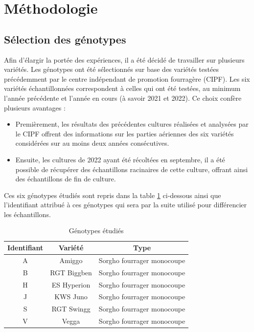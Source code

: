 \section{Méthodologie}

\subsection{Sélection des génotypes}
Afin d'élargir la portée des expériences, il a été décidé de travailler sur plusieurs variétés.
Les génotypes ont été sélectionnés sur base des variétés testées précédemment par le centre indépendant de promotion fourragère (CIPF).
Les six variétés échantillonnées correspondent à celles qui ont été testées, au minimum l'année précédente et l'année en cours (à savoir 2021 et 2022).
Ce choix confère plusieurs avantages :
\begin{itemize}
    \item Premièrement, les résultats des précédentes cultures réalisées et analysées par le CIPF offrent des informations sur les parties aériennes des six variétés considérées sur au moins deux années consécutives.
    \item Ensuite, les cultures de 2022 ayant été récoltées en septembre, il a été possible de récupérer des échantillons racinaires de cette culture, offrant ainsi des échantillons de fin de culture.
\end{itemize}
Ces six génotypes étudiés sont repris dans la table \ref{tab:variete} ci-dessous ainsi que l'identifiant attribué à ces génotypes qui sera par la suite utilisé pour différencier les échantillons.

\begin{table}[ht]
    \centering
    \caption{Génotypes étudiés}
    \begin{tabular}{c c c}
        \hline
        \textbf{Identifiant} & \textbf{Variété} & \textbf{Type} \\
        \hline
        \hline
        A & Amiggo & Sorgho fourrager monocoupe \\
        B & RGT Biggben & Sorgho fourrager monocoupe \\
        H & ES Hyperion & Sorgho fourrager monocoupe \\
        J & KWS Juno & Sorgho fourrager monocoupe \\
        S & RGT Swingg & Sorgho fourrager monocoupe \\
        V & Vegga & Sorgho fourrager monocoupe
    \end{tabular}
    \label{tab:variete}
\end{table}

